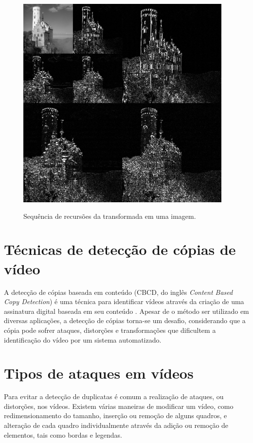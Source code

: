  \begin{figure}[h]
      \centering
      \caption{Sequência de recursões da transformada em uma imagem.}
      \includegraphics[width=0.96\textwidth]{dados/figuras/haar.png}      
      \label{fig:transf_haar}
    \end{figure}  

\section{Técnicas de detecção de cópias de vídeo}
    A detecção de cópias baseada em conteúdo (CBCD, do inglês \textit{Content Based Copy Detection}) é uma técnica para identificar vídeos através da criação de uma assinatura digital baseada em seu conteúdo \cite{jiang2011pku}. Apesar de o método ser utilizado em diversas aplicações, a detecção de cópias torna-se um desafio, considerando que a cópia pode sofrer ataques, distorções e transformações que dificultem a identificação do vídeo por um sistema automatizado.


\section{Tipos de ataques em vídeos}
\label{sec:ataques}

	Para evitar a detecção de duplicatas é comum a realização de ataques, ou distorções, nos vídeos. Existem várias maneiras de modificar um vídeo, como redimensionamento do tamanho, inserção ou remoção de alguns quadros, e alteração de cada quadro individualmente através da adição ou remoção de elementos, tais como bordas e legendas.

